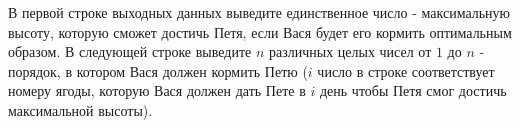 В первой строке выходных данных выведите единственное число - максимальную высоту, которую сможет достичь Петя, если Вася будет его кормить оптимальным образом.
В следующей строке выведите $n$ различных целых чисел от $1$ до $n$ - порядок, в котором Вася должен кормить Петю ($i$ число в строке соответствует номеру ягоды, которую Вася должен дать Пете в $i$ день чтобы Петя смог достичь максимальной высоты).